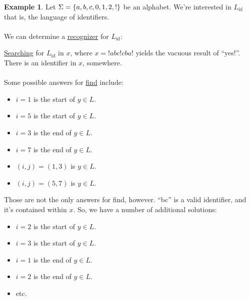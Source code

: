 \documentclass[]{article}
\DeclarePairedDelimiter{\set}{\lbrace}{\rbrace}
\theoremstyle{definition}
\newtheorem{ex}{Example}[section]
\begin{document}
			\begin{ex}
				Let $\Sigma = \set{a, b, c, 0, 1, 2, !}$ be an alphabet. We're interested in $L_{\text{id}}$ \textendash{} that is, the language of identifiers.
				\\ \\
				We can determine a \underline{recognizer} for $L_{\text{id}}$:
				\begin{center}
				\end{center}

				\underline{Searching} for $L_{\text{id}}$ in $x$, where $x = !abc!cba!$ yields the vacuous result of ``yes!''. There is an identifier in $x$, somewhere.
				\\ \\
				Some possible answers for \underline{find} include:
				\begin{itemize}
					\item $i = 1$ is the start of $y \in L$.
					\item $i = 5$ is the start of $y \in L$.
					\item $i = 3$ is the end of $y \in L$.
					\item $i = 7$ is the end of $y \in L$.
					\item $(i, j) = (1, 3)$ is $y \in L$.
					\item $(i, j) = (5, 7)$ is $y \in L$.
				\end{itemize}

				Those are not the only answers for find, however. ``bc'' is a valid identifier, and it's contained within $x$. So, we have a number of additional solutions:
				\begin{itemize}
					\item $i = 2$ is the start of $y \in L$.
					\item $i = 3$ is the start of $y \in L$.
					\item $i = 1$ is the end of $y \in L$.
					\item $i = 2$ is the end of $y \in L$.
					\item etc.
				\end{itemize}


\end{ex}
\end{document}
